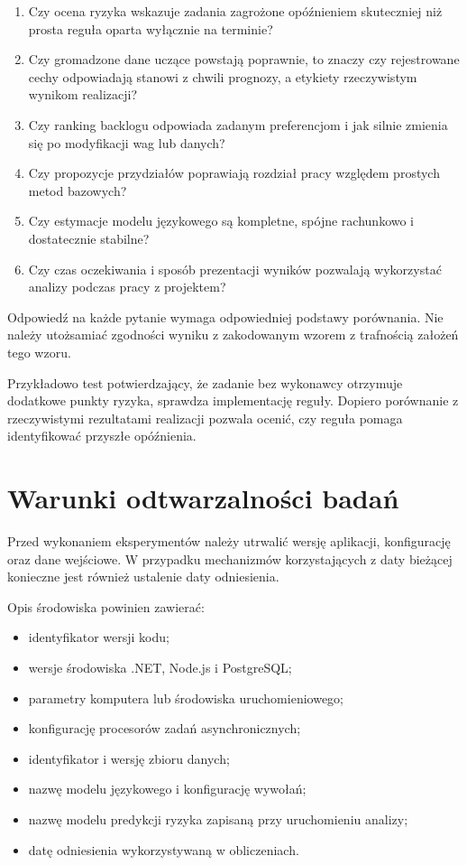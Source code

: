 \begin{enumerate}
    \item Czy ocena ryzyka wskazuje zadania zagrożone opóźnieniem skuteczniej niż prosta reguła oparta wyłącznie na terminie?
    \item Czy gromadzone dane uczące powstają poprawnie, to znaczy czy rejestrowane cechy odpowiadają stanowi z chwili prognozy, a etykiety rzeczywistym wynikom realizacji?
    \item Czy ranking backlogu odpowiada zadanym preferencjom i jak silnie zmienia się po modyfikacji wag lub danych?
    \item Czy propozycje przydziałów poprawiają rozdział pracy względem prostych metod bazowych?
    \item Czy estymacje modelu językowego są kompletne, spójne rachunkowo i dostatecznie stabilne?
    \item Czy czas oczekiwania i sposób prezentacji wyników pozwalają wykorzystać analizy podczas pracy z projektem?
\end{enumerate}

Odpowiedź na każde pytanie wymaga odpowiedniej podstawy porównania. Nie należy utożsamiać zgodności wyniku z zakodowanym wzorem z trafnością założeń tego wzoru.

Przykładowo test potwierdzający, że zadanie bez wykonawcy otrzymuje dodatkowe punkty ryzyka, sprawdza implementację reguły. Dopiero porównanie z rzeczywistymi rezultatami realizacji pozwala ocenić, czy reguła pomaga identyfikować przyszłe opóźnienia.

\section{Warunki odtwarzalności badań}

Przed wykonaniem eksperymentów należy utrwalić wersję aplikacji, konfigurację oraz dane wejściowe. W przypadku mechanizmów korzystających z daty bieżącej konieczne jest również ustalenie daty odniesienia.

Opis środowiska powinien zawierać:

\begin{itemize}
    \item identyfikator wersji kodu;
    \item wersje środowiska .NET, Node.js i PostgreSQL;
    \item parametry komputera lub środowiska uruchomieniowego;
    \item konfigurację procesorów zadań asynchronicznych;
    \item identyfikator i wersję zbioru danych;
    \item nazwę modelu językowego i konfigurację wywołań;
    \item nazwę modelu predykcji ryzyka zapisaną przy uruchomieniu analizy;
    \item datę odniesienia wykorzystywaną w obliczeniach.
\end{itemize}

